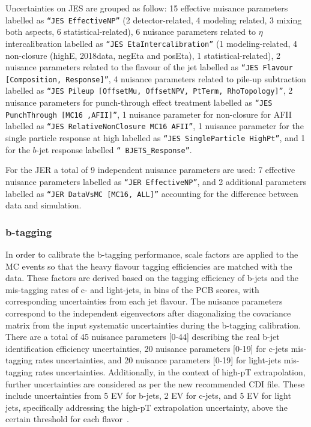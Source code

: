 Uncertainties on JES are grouped as follow: 15 effective nuisance parameters labelled as \texttt{``JES EffectiveNP''} (2 detector-related, 4 modeling related, 3 mixing both aspects, 6 statistical-related), 6 nuisance parameters related to $\eta$ intercalibration labelled as  \texttt{``JES EtaIntercalibration''} (1 modeling-related, 4 non-closure (highE, 2018data, negEta and posEta), 1 statistical-related), 2 nuisance parameters related to the flavour of the jet labelled as \texttt{``JES Flavour [Composition, Response]''},  4 nuisance parameters related to pile-up subtraction labelled as \texttt{``JES Pileup [OffsetMu, OffsetNPV, PtTerm, RhoTopology]''}, 2 nuisance parameters for punch-through effect treatment labelled as  \texttt{``JES PunchThrough [MC16 ,AFII]''}, 1 nuisance parameter  for non-closure for AFII labelled as \texttt{``JES RelativeNonClosure MC16 AFII''}, 1 nuisance parameter  for the single particle response at high  \pT labelled as \texttt{``JES SingleParticle HighPt''}, and 1 for the $b$-jet response labelled \texttt{`` BJETS\_Response''}.

For the JER a total of 9 independent nuisance parameters are used: 7 effective nuisance parameters labelled as  \texttt{``JER EffectiveNP''}, and 2 additional parameters labelled as  \texttt{``JER DataVsMC [MC16, ALL]''} accounting for the  difference between data and simulation.

\subsubsection{b-tagging}
\label{b-tagging_uncertianties}

In order to calibrate the b-tagging performance, scale factors are applied to the MC events so that the heavy flavour tagging efficiencies are matched with the data. These factors are derived based on the tagging efficiency of b-jets and the mis-tagging rates of c- and light-jets, in bins of the PCB scores, with corresponding uncertainties from each jet flavour. The nuisance parameters correspond to the independent eigenvectors after diagonalizing the covariance matrix from the input systematic uncertainties during the b-tagging calibration. There are a total of 45 nuisance parameters [0-44] describing the real b-jet identification efficiency uncertainties, 20 nuisance parameters [0-19] for c-jets mis-tagging rates uncertainties, and 20 nuisance parameters [0-19] for light-jets mis-tagging rates uncertainties. Additionally, in the context of high-pT extrapolation, further uncertainties are considered as per the new recommended CDI file. These include uncertainties from 5 EV for b-jets, 2 EV for c-jets, and 5 EV for light jets, specifically addressing the high-pT extrapolation uncertainty, above the certain threshold for each flavor~\cite{high_pt_extrapolation,btagging_rec_2023}.



